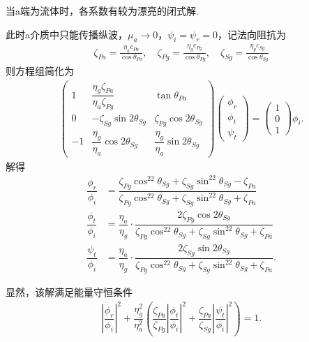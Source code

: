 \begin{exbox}
	当a端为流体时，各系数有较为漂亮的闭式解.

	此时a介质中只能传播纵波，\(\mu_a \to 0\)，\(\psi_i = \psi_r = 0\)，记法向阻抗为
	\begin{align*}
		\zeta_{Pa} = \frac{\eta_a c_{Pa}}{\cos\theta_{Pa}},\quad
		\zeta_{Pg} = \frac{\eta_g c_{Pg}}{\cos\theta_{Pg}},\quad
		\zeta_{Sg} = \frac{\eta_g c_{Sg}}{\cos\theta_{Sg}}
	\end{align*}
	则方程组简化为
	\begin{align*}
		\begin{pmatrix}
			1  & \dfrac{\eta_g \zeta_{Pa}}{\eta_a \zeta_{Pg}} & \tan\theta_{Pa} \\[8pt]
			0  & -\zeta_{Sg} \sin2\theta_{Sg}                 & \zeta_{Pg} \cos2\theta_{Sg}                                  \\[8pt]
			-1 & \dfrac{\eta_g}{\eta_a} \cos2\theta_{Sg}      & \dfrac{\eta_g}{\eta_a} \sin2\theta_{Sg}
		\end{pmatrix} \begin{pmatrix} \phi_r \\ \phi_t \\ \psi_t \end{pmatrix} =
		\begin{pmatrix} 1 \\ 0 \\ 1 \end{pmatrix} \phi_i.
	\end{align*}
	解得
	\begin{align*}
		\dfrac{\phi_r}{\phi_i} &= \dfrac{\zeta_{Pg} \cos^22\theta_{Sg} + \zeta_{Sg} \sin^22\theta_{Sg} - \zeta_{Pa}}{\zeta_{Pg} \cos^22\theta_{Sg} + \zeta_{Sg} \sin^22\theta_{Sg} + \zeta_{Pa}}\\
		\dfrac{\phi_t}{\phi_i} &= \dfrac{\eta_a}{\eta_g} \cdot \dfrac{2 \zeta_{Pg} \cos2\theta_{Sg}}{\zeta_{Pg} \cos^22\theta_{Sg} + \zeta_{Sg} \sin^22\theta_{Sg} + \zeta_{Pa}}\\
		\dfrac{\psi_t}{\phi_i} &= \dfrac{\eta_a}{\eta_g} \cdot \dfrac{2 \zeta_{Sg} \sin2\theta_{Sg}}{\zeta_{Pg} \cos^22\theta_{Sg} + \zeta_{Sg} \sin^22\theta_{Sg} + \zeta_{Pa}}.
	\end{align*}

	显然，该解满足能量守恒条件
	\begin{align*}
		\left| \dfrac{\phi_r}{\phi_i} \right|^2 + \dfrac{\eta_g^2}{\eta_a^2} \left( \dfrac{\zeta_{Pa}}{\zeta_{Pg}} \left| \dfrac{\phi_t}{\phi_i} \right|^2 + \dfrac{\zeta_{Pa}}{\zeta_{Sg}} \left| \dfrac{\psi_t}{\phi_i} \right|^2 \right) = 1.
	\end{align*}

\end{exbox}
